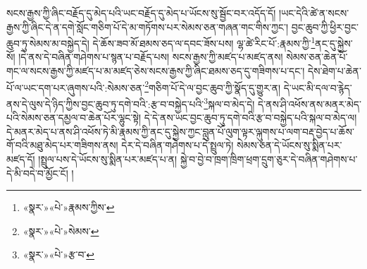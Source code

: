 སངས་རྒྱས་ཀྱི་ཞིང་བརྗོད་དུ་མེད་པའི་ཡང་བརྗོད་དུ་མེད་པ་ཡོངས་སུ་སྦྱོང་བར་འདོད་དོ། །ཡང་དེའི་ཚེ་ན་སངས་རྒྱས་ཀྱི་ཞིང་དེ་ན་དགེ་སློང་གཅིག་པོ་དེ་མ་གཏོགས་པར་སེམས་ཅན་གཞན་གང་གིས་ཀྱང་། བྱང་ཆུབ་ཀྱི་ཕྱིར་བྱང་ཆུབ་ཏུ་སེམས་མ་བསྐྱེད་དེ། དེ་ཆོས་ཟབ་མོ་ཐམས་ཅད་ལ་དབང་ཟོས་པས། ལྷ་ཚེ་རིང་པོ་:རྣམས་ཀྱི་\footnote{«སྣར་»«པེ་»རྣམས་ཀྱིས་}ནང་དུ་སྐྱེས་སོ། །དེ་ནས་དེ་བཞིན་གཤེགས་པ་སྙན་པ་བརྗོད་པས། སངས་རྒྱས་ཀྱི་མཛད་པ་མཛད་ནས། སེམས་ཅན་ཆེན་པོ་གང་ལ་སངས་རྒྱས་ཀྱི་མཛད་པ་མ་མཛད་ཅེས་སངས་རྒྱས་ཀྱི་ཞིང་ཐམས་ཅད་དུ་གཟིགས་པ་དང་། དེས་ཐེག་པ་ཆེན་པོ་ལ་ཡང་དག་པར་ཞུགས་པའི་:སེམས་ཅན་\footnote{«སྣར་»«པེ་»སེམས་}གཅིག་པོ་དེ་ལ་བྱང་ཆུབ་ཀྱི་སྣོད་དུ་གྱུར་ན། དེ་ཡང་མི་དལ་བ་རྙེད་ནས་དེ་ལུས་དེ་ཉིད་ཀྱིས་བྱང་ཆུབ་ཏུ་དགེ་བའི་:རྩ་བ་བསྐྱེད་པའི་\footnote{«སྣར་»«པེ་»རྩ་བ་}སྐལ་བ་མེད་དེ། དེ་ནས་ཤི་འཕོས་ནས་མནར་མེད་པའི་སེམས་ཅན་དམྱལ་བ་ཆེན་པོར་ལྷུང་སྟེ། དེ་དེ་ནས་ཡང་བྱང་ཆུབ་ཏུ་དགེ་བའི་རྩ་བ་བསྐྱེད་པའི་སྐལ་བ་མེད་ལ། དེ་མནར་མེད་པ་ནས་ཤི་འཕོས་ཏེ་མི་རྣམས་ཀྱི་ནང་དུ་སྐྱེས་ཀྱང་བླུན་པོ་ལུག་ལྟར་ལྐུགས་པ་ལག་བརྡ་བྱེད་པ་ཆོས་གོ་བའི་མཐུ་མེད་པར་གཟིགས་ནས། དེར་དེ་བཞིན་གཤེགས་པ་དེ་སྤྲུལ་ཏེ། སེམས་ཅན་དེ་ཡོངས་སུ་སྨིན་པར་མཛད་དོ། །སྤྲུལ་པས་དེ་ཡོངས་སུ་སྨིན་པར་མཛད་པ་ན། སྐྱེ་བ་བྱེ་བ་ཁྲག་ཁྲིག་ཕྲག་དྲུག་ཅུར་དེ་བཞིན་གཤེགས་པ་དེ་མི་བདེ་བ་མྱོང་ངོ། །
